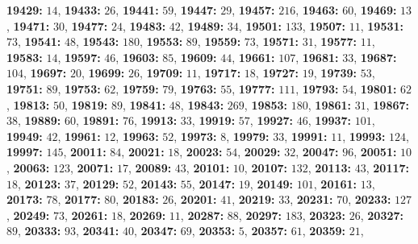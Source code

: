 \textsf{\bfseries 19429:} $14$, \textsf{\bfseries 19433:} $26$, \textsf{\bfseries 19441:} $59$, \textsf{\bfseries 19447:} $29$, \textsf{\bfseries 19457:} $216$, \textsf{\bfseries 19463:} $60$, \textsf{\bfseries 19469:} $13$, \textsf{\bfseries 19471:} $30$, \textsf{\bfseries 19477:} $24$, \textsf{\bfseries 19483:} $42$, \textsf{\bfseries 19489:} $34$, \textsf{\bfseries 19501:} $133$, \textsf{\bfseries 19507:} $11$, \textsf{\bfseries 19531:} $73$, \textsf{\bfseries 19541:} $48$, \textsf{\bfseries 19543:} $180$, \textsf{\bfseries 19553:} $89$, \textsf{\bfseries 19559:} $73$, \textsf{\bfseries 19571:} $31$, \textsf{\bfseries 19577:} $11$, \textsf{\bfseries 19583:} $14$, \textsf{\bfseries 19597:} $46$, \textsf{\bfseries 19603:} $85$, \textsf{\bfseries 19609:} $44$, \textsf{\bfseries 19661:} $107$, \textsf{\bfseries 19681:} $33$, \textsf{\bfseries 19687:} $104$, \textsf{\bfseries 19697:} $20$, \textsf{\bfseries 19699:} $26$, \textsf{\bfseries 19709:} $11$, \textsf{\bfseries 19717:} $18$, \textsf{\bfseries 19727:} $19$, \textsf{\bfseries 19739:} $53$, \textsf{\bfseries 19751:} $89$, \textsf{\bfseries 19753:} $62$, \textsf{\bfseries 19759:} $79$, \textsf{\bfseries 19763:} $55$, \textsf{\bfseries 19777:} $111$, \textsf{\bfseries 19793:} $54$, \textsf{\bfseries 19801:} $62$, \textsf{\bfseries 19813:} $50$, \textsf{\bfseries 19819:} $89$, \textsf{\bfseries 19841:} $48$, \textsf{\bfseries 19843:} $269$, \textsf{\bfseries 19853:} $180$, \textsf{\bfseries 19861:} $31$, \textsf{\bfseries 19867:} $38$, \textsf{\bfseries 19889:} $60$, \textsf{\bfseries 19891:} $76$, \textsf{\bfseries 19913:} $33$, \textsf{\bfseries 19919:} $57$, \textsf{\bfseries 19927:} $46$, \textsf{\bfseries 19937:} $101$, \textsf{\bfseries 19949:} $42$, \textsf{\bfseries 19961:} $12$, \textsf{\bfseries 19963:} $52$, \textsf{\bfseries 19973:} $8$, \textsf{\bfseries 19979:} $33$, \textsf{\bfseries 19991:} $11$, \textsf{\bfseries 19993:} $124$, \textsf{\bfseries 19997:} $145$, \textsf{\bfseries 20011:} $84$, \textsf{\bfseries 20021:} $18$, \textsf{\bfseries 20023:} $54$, \textsf{\bfseries 20029:} $32$, \textsf{\bfseries 20047:} $96$, \textsf{\bfseries 20051:} $10$, \textsf{\bfseries 20063:} $123$, \textsf{\bfseries 20071:} $17$, \textsf{\bfseries 20089:} $43$, \textsf{\bfseries 20101:} $10$, \textsf{\bfseries 20107:} $132$, \textsf{\bfseries 20113:} $43$, \textsf{\bfseries 20117:} $18$, \textsf{\bfseries 20123:} $37$, \textsf{\bfseries 20129:} $52$, \textsf{\bfseries 20143:} $55$, \textsf{\bfseries 20147:} $19$, \textsf{\bfseries 20149:} $101$, \textsf{\bfseries 20161:} $13$, \textsf{\bfseries 20173:} $78$, \textsf{\bfseries 20177:} $80$, \textsf{\bfseries 20183:} $26$, \textsf{\bfseries 20201:} $41$, \textsf{\bfseries 20219:} $33$, \textsf{\bfseries 20231:} $70$, \textsf{\bfseries 20233:} $127$, \textsf{\bfseries 20249:} $73$, \textsf{\bfseries 20261:} $18$, \textsf{\bfseries 20269:} $11$, \textsf{\bfseries 20287:} $88$, \textsf{\bfseries 20297:} $183$, \textsf{\bfseries 20323:} $26$, \textsf{\bfseries 20327:} $89$, \textsf{\bfseries 20333:} $93$, \textsf{\bfseries 20341:} $40$, \textsf{\bfseries 20347:} $69$, \textsf{\bfseries 20353:} $5$, \textsf{\bfseries 20357:} $61$, \textsf{\bfseries 20359:} $21$, 
